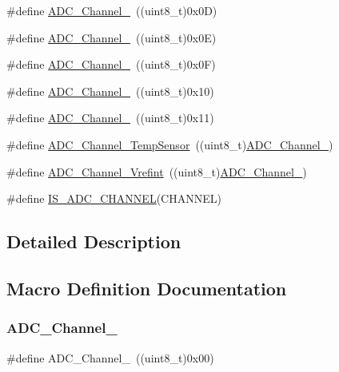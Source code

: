 \begin{DoxyCompactItemize}
\#define \hyperlink{group___a_d_c__channels_ga517cda911256f722eb067d7140663230}{A\+D\+C\+\_\+\+Channel\+\_}~((uint8\+\_\+t)0x0\+D)
\item 
\#define \hyperlink{group___a_d_c__channels_gaf1830a03fe4a3820fde4f41ba907c394}{A\+D\+C\+\_\+\+Channel\+\_}~((uint8\+\_\+t)0x0\+E)
\item 
\#define \hyperlink{group___a_d_c__channels_ga01431a7b4e388beb241328874abdf88c}{A\+D\+C\+\_\+\+Channel\+\_}~((uint8\+\_\+t)0x0\+F)
\item 
\#define \hyperlink{group___a_d_c__channels_ga52fb09ae9a0333a0e071da106466c659}{A\+D\+C\+\_\+\+Channel\+\_}~((uint8\+\_\+t)0x10)
\item 
\#define \hyperlink{group___a_d_c__channels_ga58cdfe3a5625f198116d163b09698cea}{A\+D\+C\+\_\+\+Channel\+\_}~((uint8\+\_\+t)0x11)
\item 
\#define \hyperlink{group___a_d_c__channels_ga1efc096b8d4a8d15c4a7d91f5c03c6c7}{A\+D\+C\+\_\+\+Channel\+\_\+\+Temp\+Sensor}~((uint8\+\_\+t)\hyperlink{group___a_d_c__channels_ga52fb09ae9a0333a0e071da106466c659}{A\+D\+C\+\_\+\+Channel\+\_})
\item 
\#define \hyperlink{group___a_d_c__channels_ga5d48ded5138e6f1efe3a7634eff4d125}{A\+D\+C\+\_\+\+Channel\+\_\+\+Vrefint}~((uint8\+\_\+t)\hyperlink{group___a_d_c__channels_ga58cdfe3a5625f198116d163b09698cea}{A\+D\+C\+\_\+\+Channel\+\_})
\item 
\#define \hyperlink{group___a_d_c__channels_gaba41910dcb2b449c613a5ef638862e77}{I\+S\+\_\+\+A\+D\+C\+\_\+\+C\+H\+A\+N\+N\+EL}(C\+H\+A\+N\+N\+EL)
\end{DoxyCompactItemize}


\subsection{Detailed Description}


\subsection{Macro Definition Documentation}
\mbox{\label{group___a_d_c__channels_ga40ec353803e9470a5721ef5bf0b1ab24}} 
\subsubsection{\texorpdfstring{A\+D\+C\+\_\+\+Channel\+\_}{ADC\_Channel\_0}}
{\footnotesize\ttfamily \#define A\+D\+C\+\_\+\+Channel\+\_~((uint8\+\_\+t)0x00)}




